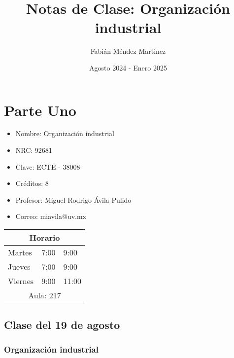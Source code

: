 \documentclass[letterpaper,12pt,twocolumn]{report}
\title{Notas de Clase: Organización industrial}
\author{Fabián Méndez Martinez}
\date{Agosto 2024 - Enero 2025}
\begin{document}
\maketitle
\tableofcontents


\chapter{Parte Uno}


\begin{tcolorbox}[title=\large Información de la EE]
    \begin{itemize}
        \item Nombre: Organización industrial
        \item NRC: 92681
        \item Clave: ECTE - 38008
        \item Créditos: 8
    \end{itemize}
\end{tcolorbox}

\begin{tcolorbox}[title=\large Información del Profesor]
    \begin{itemize}
        \item Profesor: Miguel Rodrigo Ávila
Pulido
        \item Correo: miavila@uv.mx
    \end{itemize}
\end{tcolorbox}

\begin{table}[h]
\centering
\begin{tabular}{l|ll}
\multicolumn{3}{c}{\textbf{Horario}}      \\ 
\hline
Martes     & 7:00 & 9:00          \\ 
\hline
Jueves & 7:00 & 9:00          \\ 
\hline
Viernes   & 9:00 & 11:00          \\ 
\hline
\multicolumn{3}{c}{Aula: 217}   
\end{tabular}
\end{table}
\pagebreak

\section{Clase del 19 de agosto}

\subsection*{Organización industrial}
\end{document}
